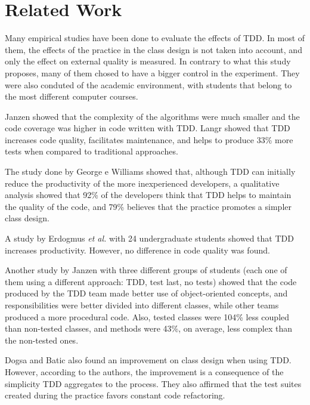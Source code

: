 \documentclass[times]{speauth}
\begin{document}
\section{Related Work}
\label{cap:trabalhos-relacionados}

Many empirical studies have been done to evaluate the effects of TDD.
In most of them, the effects of the practice in the class design is not taken
into account, and only the effect on external quality is measured.
In contrary to what this study proposes, many of them chosed
to have a bigger control in the experiment. They were also conduted of the academic
environment, with students that belong to the most different computer courses.

Janzen \cite{janzen-arch-improvement} showed that the complexity of the algorithms
were much smaller and the code coverage was higher in code written with TDD.
Langr \cite{langr} showed that TDD increases code quality, facilitates
maintenance, and helps to produce 33\% more tests when compared to traditional
approaches.

The study done by George e Williams \cite{george-e-williams} showed that,
although TDD can initially reduce the productivity of the more inexperienced
developers, a qualitative analysis showed that 92\% of the developers think
that TDD helps to maintain the quality of the code, and 79\% believes that
the practice promotes a simpler class design.

A study by Erdogmus \textit{et al.} \cite{erdogmus-morisio} with 24 undergraduate students
showed that TDD increases productivity. However, no difference in code quality
was found.

Another study by Janzen \cite{janzen-saiedian} with three different groups
of students (each one of them using a different approach: TDD, test last, no tests)
showed that the code produced by the TDD team made better use of object-oriented
concepts, and responsibilities were better divided into different classes,
while other teams produced a more procedural code. Also, tested classes were
104\% less coupled than non-tested classes, and methods were 43\%, on average, less complex
than the non-tested ones.

Dogsa and Batic \cite{dogsa-batic} also found an improvement on class design when
using TDD. However, according to the authors, the improvement is a consequence of the simplicity
TDD aggregates to the process. They also affirmed that the test suites created during
the practice favors constant code refactoring.
\end{document}
